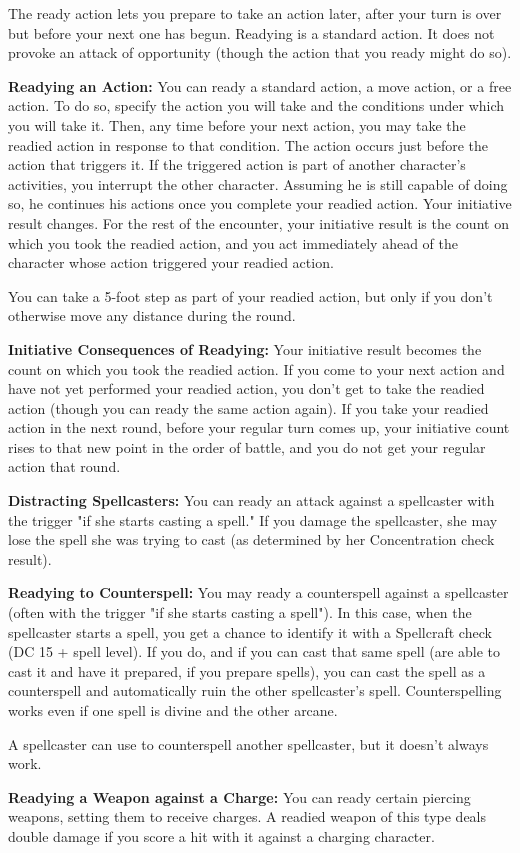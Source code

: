 The ready action lets you prepare to take an action later, after your turn is over 
but before your next one has begun. Readying is a standard action. It does not 
provoke an attack of opportunity (though the action that you ready might do so).

\textbf{Readying an Action:} You can ready a standard action, a move action, or 
a free action. To do so, specify the action you will take and the conditions under 
which you will take it. Then, any time before your next action, you may take the 
readied action in response to that condition. The action occurs just before the 
action that triggers it. If the triggered action is part of another character's 
activities, you interrupt the other character. Assuming he is still capable of 
doing so, he continues his actions once you complete your readied action. Your 
initiative result changes. For the rest of the encounter, your initiative result 
is the count on which you took the readied action, and you act immediately ahead 
of the character whose action triggered your readied action.

You can take a 5-foot step as part of your readied action, but only if you don't 
otherwise move any distance during the round. 

\textbf{Initiative Consequences of Readying:} Your initiative result becomes the 
count on which you took the readied action. If you come to your next action and 
have not yet performed your readied action, you don't get to take the readied action 
(though you can ready the same action again). If you take your readied action in 
the next round, before your regular turn comes up, your initiative count rises 
to that new point in the order of battle, and you do not get your regular action 
that round.

\textbf{Distracting Spellcasters:} You can ready an attack against a spellcaster 
with the trigger "if she starts casting a spell." If you damage the spellcaster, 
she may lose the spell she was trying to cast (as determined by her Concentration 
check result).

\textbf{Readying to Counterspell:} You may ready a counterspell against a spellcaster 
(often with the trigger "if she starts casting a spell"). In this case, when 
the spellcaster starts a spell, you get a chance to identify it with a Spellcraft 
check (DC 15 + spell level). If you do, and if you can cast that same spell (are 
able to cast it and have it prepared, if you prepare spells), you can cast the 
spell as a counterspell and automatically ruin the other spellcaster's spell. Counterspelling 
works even if one spell is divine and the other arcane.

A spellcaster can use  to counterspell another spellcaster, 
but it doesn't always work.

\textbf{Readying a Weapon against a Charge:} You can ready certain piercing weapons, 
setting them to receive charges. A readied weapon of this type deals double damage 
if you score a hit with it against a charging character.
